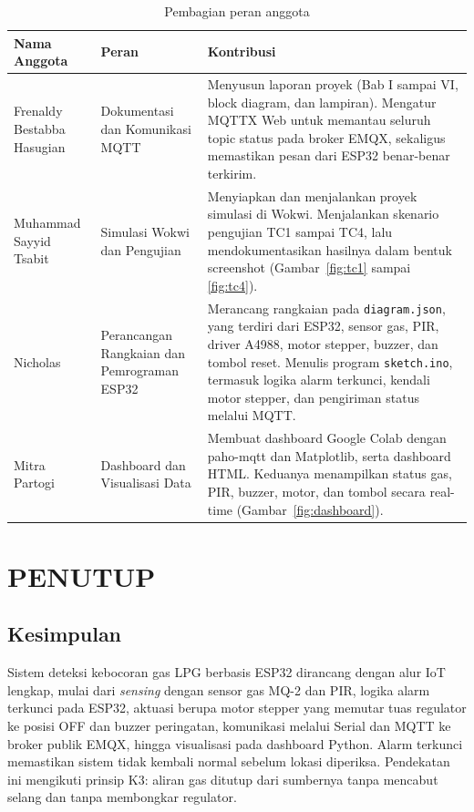 \documentclass[12pt,a4paper,oneside]{report}
\begin{document}
\begin{table}[H]
  \caption{Pembagian peran anggota}
  \label{tab:peran}
  \begin{tabularx}{\textwidth}{P{2.8cm} P{2.8cm} L}
    \toprule
    \textbf{Nama Anggota} & \textbf{Peran} & \textbf{Kontribusi} \\
    \midrule
    Frenaldy Bestabba Hasugian & Dokumentasi dan Komunikasi MQTT & Menyusun laporan proyek (Bab I sampai VI, block diagram, dan lampiran). Mengatur MQTTX Web untuk memantau seluruh topic status pada broker EMQX, sekaligus memastikan pesan dari ESP32 benar-benar terkirim. \\
    \midrule
    Muhammad Sayyid Tsabit & Simulasi Wokwi dan Pengujian & Menyiapkan dan menjalankan proyek simulasi di Wokwi. Menjalankan skenario pengujian TC1 sampai TC4, lalu mendokumentasikan hasilnya dalam bentuk screenshot (Gambar~\ref{fig:tc1} sampai \ref{fig:tc4}). \\
    \midrule
    Nicholas & Perancangan Rangkaian dan Pemrograman ESP32 & Merancang rangkaian pada \texttt{diagram.json}, yang terdiri dari ESP32, sensor gas, PIR, driver A4988, motor stepper, buzzer, dan tombol reset. Menulis program \texttt{sketch.ino}, termasuk logika alarm terkunci, kendali motor stepper, dan pengiriman status melalui MQTT. \\
    \midrule
    Mitra Partogi & Dashboard dan Visualisasi Data & Membuat dashboard Google Colab dengan paho-mqtt dan Matplotlib, serta dashboard HTML. Keduanya menampilkan status gas, PIR, buzzer, motor, dan tombol secara real-time (Gambar~\ref{fig:dashboard}). \\
    \bottomrule
  \end{tabularx}
\end{table}

\chapter{PENUTUP}

\section{Kesimpulan}
Sistem deteksi kebocoran gas LPG berbasis ESP32 dirancang dengan alur IoT lengkap, mulai dari \emph{sensing} dengan sensor gas MQ-2 dan PIR, logika alarm terkunci pada ESP32, aktuasi berupa motor stepper yang memutar tuas regulator ke posisi OFF dan buzzer peringatan, komunikasi melalui Serial dan MQTT ke broker publik EMQX, hingga visualisasi pada dashboard Python. Alarm terkunci memastikan sistem tidak kembali normal sebelum lokasi diperiksa. Pendekatan ini mengikuti prinsip K3: aliran gas ditutup dari sumbernya tanpa mencabut selang dan tanpa membongkar regulator.
\end{document}
